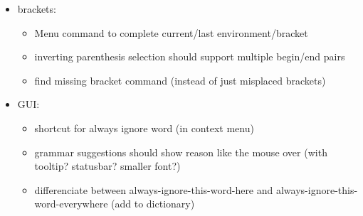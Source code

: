 \documentclass[10pt,a4paper,portrait]{article}
\begin{document}
\begin{itemize}
\begin{itemize}
	\item auto close last environment/bracket
	\item complete command options after command (files for includegraphics, environsments for begin, citations, labels, packages, tikzpictures	)
	\item Word completion over all open documents
	\item Show definition of \verb+\newcommand+ commands in the completion list as hint
	\item \verb+\begin{Umgebungsname}+ should not add \verb+\end{Umgebungsname}+ if that \textbackslash end is already in the next/a later line
	 	\item Open completion list of xyz if cursor is after \verb+\xyz{+ (= ignore \verb+{}+ before cursor)
		\item treat \verb+\+abc\{\%<xyz\%>\} and \verb+\+abc\{\%<def\%>\} as identical and ignore one of them (in the list of possible completions)
		\item Understand \verb+newcounter, tex: \newcount \newfont \def, \edef, \xdef, \gdef+
		\item Detect completion within tikz/pstricks/... environments and show a list of corresponding tikz/... commands
		\item text completion should show parameters of commands (e.g. reference names) even if they aren't currently used
		\item merging text completion and spell checker cache?
	\end{itemize}
	\item brackets: \begin{itemize}
		\item Menu command to complete current/last environment/bracket
		\item inverting parenthesis selection should support multiple begin/end pairs
		\item find missing bracket command (instead of just misplaced brackets)
	\end{itemize}  
	\item GUI: \begin{itemize}
	\item shortcut for always ignore word (in context menu)
	\item grammar suggestions should show reason like the mouse over (with tooltip? statusbar? smaller font?)
	\item differenciate between always-ignore-this-word-here and always-ignore-this-word-everywhere (add to dictionary)

\end{itemize}
\end{itemize}
\end{document}
